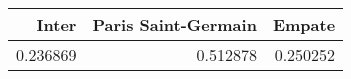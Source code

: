 \begin{tabular}{rrr}
\hline
    Inter &   Paris Saint-Germain &   Empate \\
\hline
 0.236869 &              0.512878 & 0.250252 \\
\hline
\end{tabular}